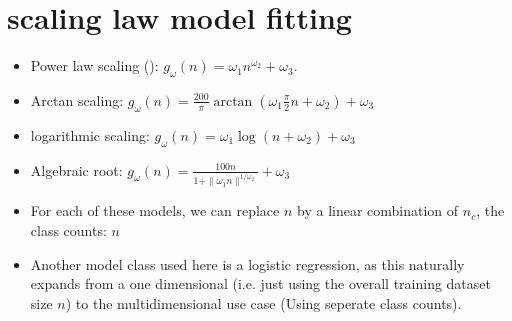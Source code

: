 \documentclass{article} %
\newcommand{\nosemic}{\SetEndCharOfAlgoLine{\relax}}%
\newcommand{\dosemic}{\SetEndCharOfAlgoLine{\string;}}%
\newcommand{\pushline}{\Indp}%
\begin{document}



\section{scaling law model fitting}

\begin{itemize}
    \item Power law scaling (\cite{mahmood2022data}): $g_{\omega}(n) = \omega_1 n^{\omega_2} + \omega_3$.
    \item Arctan scaling: $g_{\omega}(n) = \frac{200}{\pi} \arctan(\omega_1 \frac{\pi}{2}n + \omega_2) + \omega_3$
    \item logarithmic scaling: $g_{\omega}(n) = \omega_1 \log(n + \omega_2) + \omega_3$
    \item Algebraic root: $g_{\omega}(n) = \frac{100n}{1 + \| \omega_1 n\|^{1/\omega_2}} + \omega_3$
    \item For each of these models, we can replace $n$ by a linear combination of $n_c$, the class counts: $n$
    \item Another model class used here is a logistic regression, as this naturally expands from a one dimensional (i.e. just using the overall training dataset size $n$) to the multidimensional use case (Using seperate class counts). 
\end{itemize}
\end{document}
